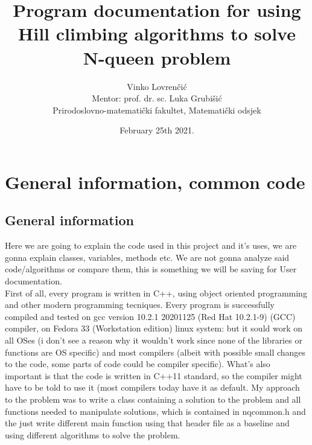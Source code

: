 \documentclass[10pt,a4paper]{article}
\author{Vinko Lovrenčić \\ \footnotesize Mentor: prof. dr. sc. Luka Grubišić \\ Prirodoslovno-matematički fakultet, Matematički odsjek}
\date{February 25th 2021.}
\title{Program documentation for using Hill climbing algorithms to solve N-queen problem}
\begin{document}
	\begin{titlepage}
                \maketitle
        \end{titlepage}
	\tableofcontents
	\pagebreak
	\section{General information, common code}
		\subsection{General information}
			Here we are going to explain the code used in this project and it's uses, we are gonna explain classes, variables, methods etc. We are not gonna analyze said code/algorithms or compare them, this is something we will be saving for User documentation. \\
			First of all, every program is written in C++, using object oriented programming and other modern programming tecniques. Every program is successfully compiled and tested on gcc version 10.2.1 20201125 (Red Hat 10.2.1-9) (GCC) compiler, on Fedora 33 (Workstation edition) linux system: but it sould work on all OSes (i don't see a reason why it wouldn't work since none of the libraries or functions are OS specific) and most compilers (albeit with possible small changes to the code, some parts of code could be compiler specific). What's also important is that the code is written in C++11 standard, so the compiler might have to be told to use it (most compilers today have it as default.
			My approach to the problem was to write a class containing a solution to the problem and all functions needed to manipulate solutions, which is contained in nqcommon.h and the just write different main function using that header file as a baseline and using different algorithms to solve the problem.
\end{document}
